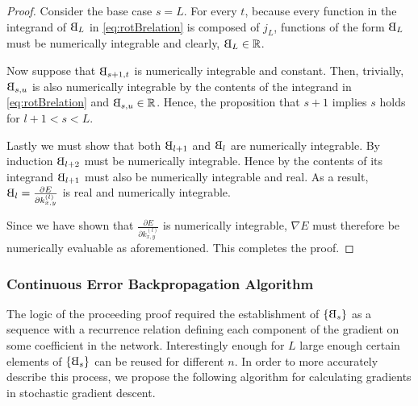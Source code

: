 \documentclass[titlepage, twoside]{article}
\numberwithin{equation}{subsection}
\numberwithin{theorem}{subsection}
\newcommand{\rotB}{\scalebox{-1}[1]{B}}
\begin{document}
\begin{proof}
  Consider the base case $s = L$. For every $t$,
  because every function in the integrand of $\rotB_L$ in \eqref{eq:rotBrelation} is composed of $j_L$, functions of the form $\rotB_L$ must be numerically integrable and clearly, $\rotB_L \in \mathbb{R}$.

  Now suppose that $\rotB_{s+1,t}$ is numerically integrable and constant. Then, trivially, $\rotB_{s,u}$ is also numerically integrable by the contents of the integrand in \eqref{eq:rotBrelation} and $\rotB_{s,u} \in \mathbb{R}$. Hence, the proposition that $s+1$ implies $s$ holds for $l+1 < s < L$.

  Lastly we must show that both $\rotB_{l+1}$ and $\rotB_{l}$ are numerically integrable. By induction $\rotB_{l+2}$ must be numerically integrable. Hence by the contents of its integrand $\rotB_{l+1}$ must also be numerically integrable and real. As a result, $\rotB_l =  \frac{\partial E}{\partial k^{(l)}_{x,y}}$ is real and numerically integrable.

  Since we have shown that $ \frac{\partial E}{\partial k^{(l)}_{x,y}}$ is numerically integrable, $\nabla E$ must therefore be numerically evaluable as aforementioned. This completes the proof.
\end{proof}


\subsubsection{Continuous Error Backpropagation Algorithm}
The logic of the proceeding proof required the establishment of $\{\rotB_s\}$ as a sequence with a recurrence relation defining each component of the gradient on some coefficient in the network. Interestingly enough for $L$ large enough certain elements of $\{\rotB_s\}$ can be reused for different $n$. In order to more accurately describe this process, we propose the following algorithm for calculating gradients in stochastic gradient descent. \\
\end{document}

